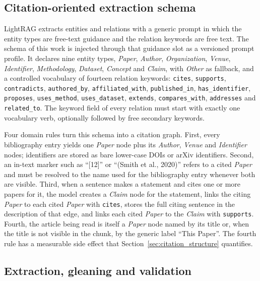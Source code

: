 \documentclass[lettersize,journal]{IEEEtran}
\begin{document}
\subsection{Citation-oriented extraction schema}
\label{sec:schema}

LightRAG extracts entities and relations with a generic prompt in which the entity types are free-text guidance and the relation keywords are free text. The schema of this work is injected through that guidance slot as a versioned prompt profile. It declares nine entity types, \emph{Paper}, \emph{Author}, \emph{Organization}, \emph{Venue}, \emph{Identifier}, \emph{Methodology}, \emph{Dataset}, \emph{Concept} and \emph{Claim}, with \emph{Other} as fallback, and a controlled vocabulary of fourteen relation keywords: \texttt{cites}, \texttt{supports}, \texttt{contradicts}, \texttt{authored\_by}, \texttt{affiliated\_with}, \texttt{published\_in}, \texttt{has\_identifier}, \texttt{proposes}, \texttt{uses\_method}, \texttt{uses\_dataset}, \texttt{extends}, \texttt{compares\_with}, \texttt{addresses} and \texttt{related\_to}. The keyword field of every relation must start with exactly one vocabulary verb, optionally followed by free secondary keywords.

Four domain rules turn this schema into a citation graph. First, every bibliography entry yields one \emph{Paper} node plus its \emph{Author}, \emph{Venue} and \emph{Identifier} nodes; identifiers are stored as bare lower-case DOIs or arXiv identifiers. Second, an in-text marker such as ``[12]'' or ``(Smith et al., 2020)'' refers to a cited \emph{Paper} and must be resolved to the name used for the bibliography entry whenever both are visible. Third, when a sentence makes a statement and cites one or more papers for it, the model creates a \emph{Claim} node for the statement, links the citing \emph{Paper} to each cited \emph{Paper} with \texttt{cites}, stores the full citing sentence in the description of that edge, and links each cited \emph{Paper} to the \emph{Claim} with \texttt{supports}. Fourth, the article being read is itself a \emph{Paper} node named by its title or, when the title is not visible in the chunk, by the generic label ``This Paper''. The fourth rule has a measurable side effect that Section~\ref{sec:citation_structure} quantifies.

\subsection{Extraction, gleaning and validation}
\end{document}
